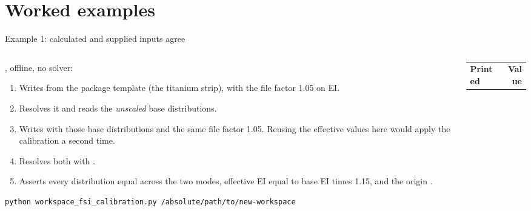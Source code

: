 %
%

\section{Worked examples}

\begin{frame}[fragile]{Example 1: calculated and supplied inputs agree}
\begin{columns}[T]
\begin{column}{0.54\textwidth}
, offline, no solver:
\begin{enumerate}\scriptsize
  \item Writes  from the package template
        (the titanium strip), with the file factor 1.05 on EI.
  \item Resolves it and reads the \emph{unscaled} base distributions.
  \item Writes  with those base distributions and the
        same file factor 1.05. Reusing the effective values here would apply
        the calibration a second time.
  \item Resolves both with .
  \item Asserts every distribution equal across the two modes, effective EI
        equal to base EI times 1.15, and the origin .
\end{enumerate}
\begin{lstlisting}[style=ftsbase, basicstyle=\ttfamily\tiny]
python workspace_fsi_calibration.py /absolute/path/to/new-workspace
\end{lstlisting}
\end{column}
\begin{column}{0.42\textwidth}
{\ftstablesize\renewcommand{\arraystretch}{1.2}
\begin{tabular}{@{}lr@{}}
\toprule
\textbf{Printed} & \textbf{Value} \\

\end{tabular}}
\end{column}
\end{columns}
\end{frame}

